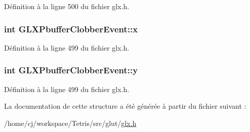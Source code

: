 Définition à la ligne 500 du fichier glx.\-h.

\hypertarget{struct_g_l_x_pbuffer_clobber_event_a8f0a7162a033c89ee94ce535580dbc32}{
\subsubsection[{x}]{\setlength{\rightskip}{0pt plus 5cm}int G\-L\-X\-Pbuffer\-Clobber\-Event\-::x}}\label{struct_g_l_x_pbuffer_clobber_event_a8f0a7162a033c89ee94ce535580dbc32}


Définition à la ligne 499 du fichier glx.\-h.

\hypertarget{struct_g_l_x_pbuffer_clobber_event_a69eb7ac60d36ac3ec4550ac206cfc61f}{
\subsubsection[{y}]{\setlength{\rightskip}{0pt plus 5cm}int G\-L\-X\-Pbuffer\-Clobber\-Event\-::y}}\label{struct_g_l_x_pbuffer_clobber_event_a69eb7ac60d36ac3ec4550ac206cfc61f}


Définition à la ligne 499 du fichier glx.\-h.



La documentation de cette structure a été générée à partir du fichier suivant \-:\begin{DoxyCompactItemize}
\item 
/home/cj/workspace/\-Tetris/src/glut/\hyperlink{glx_8h}{glx.\-h}\end{DoxyCompactItemize}

